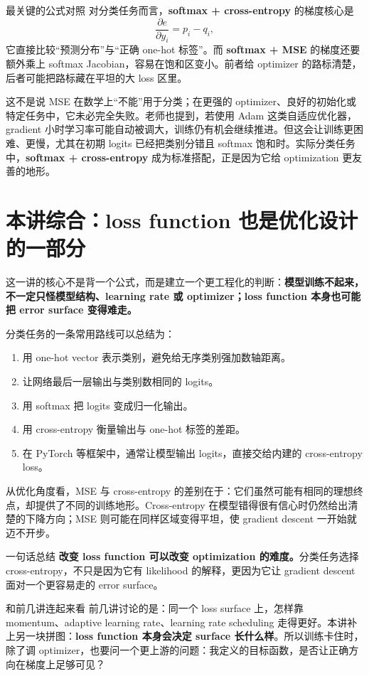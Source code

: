 \documentclass[a4paper]{article}
\begin{document}
\begin{importantbox}{最关键的公式对照}
    对分类任务而言，\textbf{softmax + cross-entropy} 的梯度核心是
    \[
        \frac{\partial e}{\partial y_i}=p_i-q_i,
    \]
    它直接比较``预测分布''与``正确 one-hot 标签''。而 \textbf{softmax + MSE} 的梯度还要额外乘上 softmax Jacobian，容易在饱和区变小。前者给 optimizer 的路标清楚，后者可能把路标藏在平坦的大 loss 区里。
\end{importantbox}

这不是说 MSE 在数学上``不能''用于分类；在更强的 optimizer、良好的初始化或特定任务中，它未必完全失败。老师也提到，若使用 Adam 这类自适应优化器，gradient 小时学习率可能自动被调大，训练仍有机会继续推进。但这会让训练更困难、更慢，尤其在初期 logits 已经把类别分错且 softmax 饱和时。实际分类任务中，\textbf{softmax + cross-entropy} 成为标准搭配，正是因为它给 optimization 更友善的地形。

\section{本讲综合：loss function 也是优化设计的一部分}

这一讲的核心不是背一个公式，而是建立一个更工程化的判断：\textbf{模型训练不起来，不一定只怪模型结构、learning rate 或 optimizer；loss function 本身也可能把 error surface 变得难走。}

分类任务的一条常用路线可以总结为：

\begin{enumerate}
    \item 用 one-hot vector 表示类别，避免给无序类别强加数轴距离。
    \item 让网络最后一层输出与类别数相同的 logits。
    \item 用 softmax 把 logits 变成归一化输出。
    \item 用 cross-entropy 衡量输出与 one-hot 标签的差距。
    \item 在 PyTorch 等框架中，通常让模型输出 logits，直接交给内建的 cross-entropy loss。
\end{enumerate}

从优化角度看，MSE 与 cross-entropy 的差别在于：它们虽然可能有相同的理想终点，却提供了不同的训练地形。Cross-entropy 在模型错得很有信心时仍然给出清楚的下降方向；MSE 则可能在同样区域变得平坦，使 gradient descent 一开始就迈不开步。

\begin{knowledgebox}{一句话总结}
    \textbf{改变 loss function 可以改变 optimization 的难度。}分类任务选择 cross-entropy，不只是因为它有 likelihood 的解释，更因为它让 gradient descent 面对一个更容易走的 error surface。
\end{knowledgebox}

\begin{importantbox}{和前几讲连起来看}
    前几讲讨论的是：同一个 loss surface 上，怎样靠 momentum、adaptive learning rate、learning rate scheduling 走得更好。本讲补上另一块拼图：\textbf{loss function 本身会决定 surface 长什么样}。所以训练卡住时，除了调 optimizer，也要问一个更上游的问题：我定义的目标函数，是否让正确方向在梯度上足够可见？
\end{importantbox}
\end{document}
